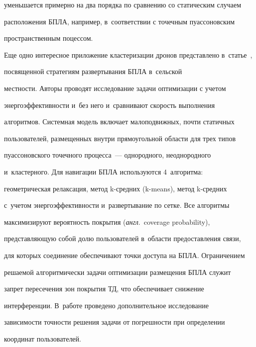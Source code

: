 уменьшается примерно на два порядка по сравнению со статическим случаем 


расположения БПЛА, например, в~соответствии с точечным пуассоновским 


пространственным поцессом. 


  


  Еще одно интересное приложение кластеризации дронов представлено в~\mbox{статье}~\cite{8-md}, 


  посвященной стратегиям развертывания БПЛА в~сельской 


мест\-ности. Авторы проводят исследование задачи оптимизации с учетом 


энерго\-эф\-фек\-тив\-ности и~без него и~сравнивают ско\-рость выполнения 


алгоритмов. Системная модель включает малоподвижных, почти статичных 


пользователей, размещенных внут\-ри прямоугольной области для трех типов 


пуассоновского точечного процесса~--- однородного, неоднородного 


и~кластерного. Для навигации \mbox{БПЛА} используются 4~алгоритма: 


геометрическая релаксация, метод \mbox{k-сред}\-них (k-means), метод k-сред\-них 


с~учетом энергоэффективности и~развертывание по сетке. Все алгоритмы 


максимизируют вероятность покрытия (\textit{англ}.\ coverage probability), 


представляющую собой долю пользователей в~области предостав\-ле\-ния связи, 


для которых соединение обеспечивают точки доступа на БПЛА. Ограничением 


решаемой алгоритмически задачи оптимизации размещения БПЛА служит 


запрет пересечения зон покрытия ТД, что обеспечивает снижение 


интерференции. В~работе проведено дополнительное исследование 


зависимости точности решения задачи от погрешности при определении 


координат пользователей.


{  %





} 


